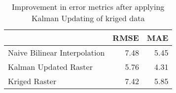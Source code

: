 \begin{table}
\centering
\caption{Improvement in error metrics after applying Kalman Updating of kriged data}
\label{tab:charlotteamalie_gebco_raster_error}
\begin{tabular}{lrr}
\toprule
 & RMSE & MAE \\
\midrule
Naive Bilinear Interpolation & 7.48 & 5.45 \\
Kalman Updated Raster & 5.76 & 4.31 \\
Kriged Raster & 7.42 & 5.85 \\
\bottomrule
\end{tabular}
\end{table}
